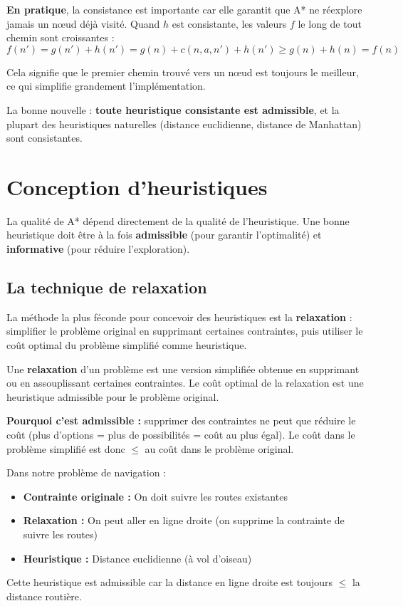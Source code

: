 \documentclass[11pt,a4paper]{article}
\begin{document}
\textbf{En pratique}, la consistance est importante car elle garantit que A* ne réexplore jamais un nœud déjà visité. Quand $h$ est consistante, les valeurs $f$ le long de tout chemin sont croissantes :
$$f(n') = g(n') + h(n') = g(n) + c(n,a,n') + h(n') \geq g(n) + h(n) = f(n)$$

Cela signifie que le premier chemin trouvé vers un nœud est toujours le meilleur, ce qui simplifie grandement l'implémentation.

La bonne nouvelle : \textbf{toute heuristique consistante est admissible}, et la plupart des heuristiques naturelles (distance euclidienne, distance de Manhattan) sont consistantes.

\section{Conception d'heuristiques}

La qualité de A* dépend directement de la qualité de l'heuristique. Une bonne heuristique doit être à la fois \textbf{admissible} (pour garantir l'optimalité) et \textbf{informative} (pour réduire l'exploration).

\subsection{La technique de relaxation}

La méthode la plus féconde pour concevoir des heuristiques est la \textbf{relaxation} : simplifier le problème original en supprimant certaines contraintes, puis utiliser le coût optimal du problème simplifié comme heuristique.

\begin{definitionbox}
Une \textbf{relaxation} d'un problème est une version simplifiée obtenue en supprimant ou en assouplissant certaines contraintes. Le coût optimal de la relaxation est une heuristique admissible pour le problème original.

\textbf{Pourquoi c'est admissible :} supprimer des contraintes ne peut que réduire le coût (plus d'options = plus de possibilités = coût au plus égal). Le coût dans le problème simplifié est donc $\leq$ au coût dans le problème original.
\end{definitionbox}

\begin{exemplebox}
Dans notre problème de navigation :
\begin{itemize}
    \item \textbf{Contrainte originale :} On doit suivre les routes existantes
    \item \textbf{Relaxation :} On peut aller en ligne droite (on supprime la contrainte de suivre les routes)
    \item \textbf{Heuristique :} Distance euclidienne (à vol d'oiseau)
\end{itemize}
Cette heuristique est admissible car la distance en ligne droite est toujours $\leq$ la distance routière.
\end{exemplebox}
\end{document}
